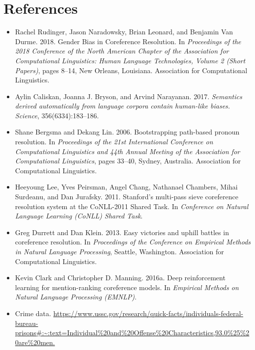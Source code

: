 \documentclass[11pt]{article}
\begin{document}
\section*{References} 
\begin{itemize}
    \item Rachel Rudinger, Jason Naradowsky, Brian Leonard, and Benjamin Van Durme. 2018. Gender Bias in Coreference Resolution. In \textit{Proceedings of the 2018 Conference of the North American Chapter of the Association for Computational Linguistics: Human Language Technologies, Volume 2 (Short Papers)}, pages 8–14, New Orleans, Louisiana. Association for Computational Linguistics.
    \item Aylin Caliskan, Joanna J. Bryson, and Arvind Narayanan. 2017. \textit{Semantics derived automatically from language corpora contain human-like biases. Science}, 356(6334):183–186.
    \item Shane Bergsma and Dekang Lin. 2006. Bootstrapping path-based pronoun resolution. In \textit{Proceedings of the 21st International Conference on Computational Linguistics and 44th Annual Meeting of the Association for Computational Linguistics}, pages 33–40, Sydney, Australia. Association for Computational Linguistics.
    \item Heeyoung Lee, Yves Peirsman, Angel Chang, Nathanael Chambers, Mihai Surdeanu, and Dan Jurafsky. 2011. Stanford’s multi-pass sieve coreference resolution system at the CoNLL-2011 Shared Task. In \textit{Conference on Natural Language Learning (CoNLL) Shared Task}.
    \item Greg Durrett and Dan Klein. 2013. Easy victories and uphill battles in coreference resolution. In \textit{Proceedings of the Conference on Empirical Methods in Natural Language Processing}, Seattle, Washington. Association for Computational Linguistics.
    \item Kevin Clark and Christopher D. Manning. 2016a. Deep reinforcement learning for mention-ranking coreference models. In \textit{Empirical Methods on Natural Language Processing (EMNLP)}.
    \item Crime data. \url{https://www.ussc.gov/research/quick-facts/individuals-federal-bureau-prisons#:~:text=Individual%20and%20Offense%20Characteristics,93.0%25%20are%20men.}
\end{itemize}
\end{document}

